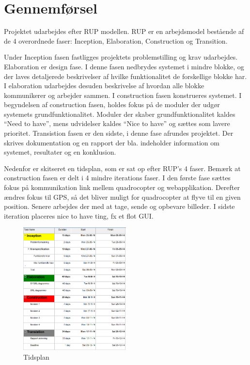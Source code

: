 \chapter{Gennemførsel}

\vspace{-10pt}

Projektet udarbejdes efter RUP modellen. RUP er en arbejdsmodel bestående af de 4 overordnede faser: Inception, Elaboration, Construction og Transition.

Under Inception fasen fastligges projektets problemstilling og krav udarbejdes.
Elaboration er design fase. I denne fasen nedbrydes systemet i mindre blokke, 
og der laves detaljerede beskrivelser af hvilke funktionalitet de forskellige blokke har.
I elaboration udarbejdes desuden beskrivelse af hvordan alle blokke kommunikerer og arbejder sammen.  
I construction fasen konstrueres systemet. I begyndelsen af construction fasen, holdes fokus på de
moduler der udgør systemets grundfunktionalitet. Moduler der skaber grundfunktionalitet kaldes “Need to have”, mens udvidelser kaldes “Nice to have” og sættes som lavere prioritet.
Transistion fasen er den sidste, i denne fase afrundes projektet. Der skrives dokumentation og en rapport der bla. indeholder information om systemet, resultater og en konklusion.


Nedenfor er skitseret en tidsplan, som er sat op efter RUP's 4 faser.
Bemærk at construction fasen er delt i 4 mindre iterations faser.
I den første fase sættes fokus på kommunikation link mellem quadrocopter og webapplikation.
Derefter ændres fokus til GPS, så det bliver muligt for quadrocopter at flyve til en given position.
Senere arbejdes der med at tage, sende og opbevare billeder.
I sidste iteration placeres nice to have ting, fx et flot GUI.



\begin{figure}[H]
\centering
\includegraphics[width=0.5\textwidth]{Billeder/Tidsplan.png}
\caption{Tidsplan}
\label{fig:Tidsplan}
\end{figure}

